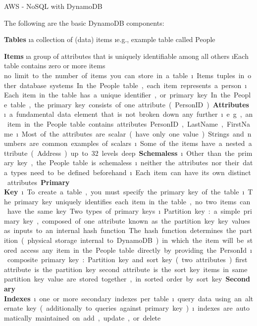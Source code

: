 \begin{frame}{AWS - NoSQL with DynamoDB}

The following are the basic DynamoDB components:


\textbf{Tables}
\i a collection of (data) items
\i e.g., example table called People

\textbf{Items}
\i a group of attributes that is uniquely identifiable among all others
\i Each table contains zero or more items
\si no limit to the number of items you can store in a table.
\i Items tuples in other database systems
\si In the People table, each item represents a person. 
\i Each item in the table has a unique identifier, or primary key
\si In the People table, the primary key consists of one attribute (PersonID)

\textbf{Attributes} 
\i a fundamental data element that is not broken down any further
\i e.g., an item in the People table contains attributes PersonID, LastName, FirstName
\i Most of the attributes are scalar (have only one value)
\si Strings and numbers are common examples of scalars
\i Some of the items have a nested attribute (Address)
\si up to 32 levels deep

\textbf{Schemaless}
\i Other than the primary key, the People table is schemaless
\i neither the attributes nor their data types need to be defined beforehand
\i Each item can have its own distinct attributes.

\textbf{Primary Key}
\i To create a table, you must specify the primary key of the table
\i The primary key uniquely identifies each item in the table, 
\si no two items can have the same key.

Two types of primary keys
\i Partition key: a simple primary key, composed of one attribute known as the partition key
\si key values as inputs to an internal hash function
\si The hash function determines the partition (physical storage internal to DynamoDB) in which the item will be stored
\si access any item in the People table directly by providing the PersonId

\i composite primary key: Partition key and sort key (two attributes)
\si first attribute is the partition key
\si second attribute is the sort key
\si items in same partition key value are stored together, in sorted order by sort key

\textbf{Secondary Indexes}
\i one or more secondary indexes per table
\i query data using an alternate key (additionally to queries against primary key) 
\i indexes are automatically maintained on add, update, or delete


\end{frame}
